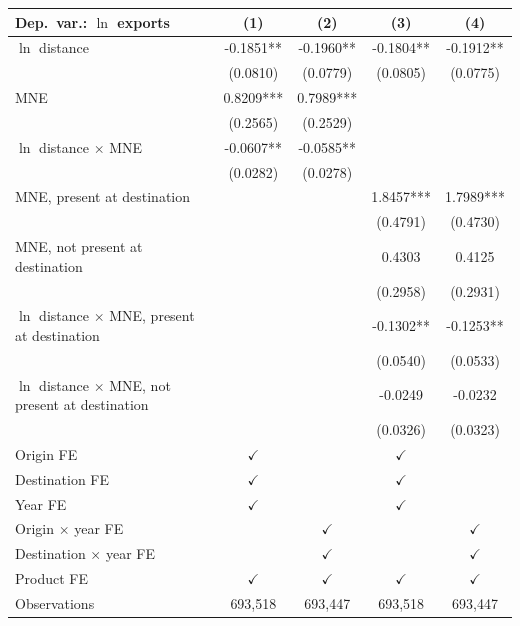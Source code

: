 \begin{tabular}{lcccc} \hline
Dep.\ var.: $\ln$ exports & (1) & (2) & (3) & (4) \\ \hline
$\ln$ distance & -0.1851** & -0.1960** & -0.1804** & -0.1912** \\
 & (0.0810) & (0.0779) & (0.0805) & (0.0775) \\
MNE & 0.8209*** & 0.7989*** &  &  \\
 & (0.2565) & (0.2529) &  &  \\
$\ln$ distance $\times$ MNE & -0.0607** & -0.0585** &  &  \\
 & (0.0282) & (0.0278) &  &  \\
MNE, present at destination &  &  & 1.8457*** & 1.7989*** \\
 &  &  & (0.4791) & (0.4730) \\
MNE, not present at destination &  &  & 0.4303 & 0.4125 \\
 &  &  & (0.2958) & (0.2931) \\
$\ln$ distance $\times$ MNE, present at destination &  &  & -0.1302** & -0.1253** \\
 &  &  & (0.0540) & (0.0533) \\
$\ln$ distance $\times$ MNE, not present at destination &  &  & -0.0249 & -0.0232 \\
 &  &  & (0.0326) & (0.0323) \\
\hline
Origin FE & $\checkmark$ &  & $\checkmark$ &  \\
Destination FE & $\checkmark$ &  & $\checkmark$ &  \\
Year FE & $\checkmark$ &  & $\checkmark$ &  \\
Origin $\times$ year FE &  & $\checkmark$ &  & $\checkmark$ \\
Destination $\times$ year FE &  & $\checkmark$ &  & $\checkmark$ \\
Product FE & $\checkmark$ & $\checkmark$ & $\checkmark$ & $\checkmark$ \\
\hline
Observations & 693,518 & 693,447 & 693,518 & 693,447 \\
\hline
\end{tabular}
